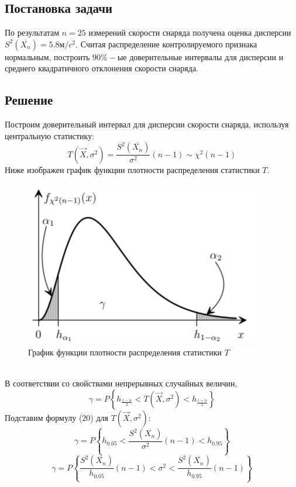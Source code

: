 \subsection*{Постановка задачи}
По результатам $n = 25$ измерений скорости снаряда получена оценка дисперсии $S^2(\overline{X_n}) = 5.8 м/c^2$. Считая распределение контролируемого признака нормальным, построить $90\%-ые$ доверительные интервалы для дисперсии и среднего квадратичного отклонения скорости снаряда.
\subsection*{Решение}
Построим доверительный интервал для дисперсии скорости снаряда, используя центральную статистику:
\begin{equation}
T(\vec{X}, \sigma^2) = \frac{S^2(\overline{X_n})}{\sigma^2}(n-1) \sim \chi^2(n-1)
\end{equation}
Ниже изображен график функции плотности распределения статистики $T$. 
\begin{figure}[h!]
	\caption{График функции плотности распределения статистики $T$}
	\center \includegraphics{img/1.png}
\end{figure}\\
В соответствии со свойствами непрерывных случайных величин,
\begin{equation}
\gamma = P\left\{ h_{\frac{1-\alpha}{2}} < T(\vec{X}, \sigma^2) < h_{\frac{1+\alpha}{2}}\right\}
\end{equation}
Подставим формулу (20) для $T(\vec{X}, \sigma^2)$:
\begin{equation}
\gamma = P\left\{ h_{0.05} < \frac{S^2(\overline{X_n})}{\sigma^2}(n-1) < h_{0.95}\right\}
\end{equation}
\begin{equation}
\gamma = P\left\{ \frac{S^2(\overline{X_n})}{h_{0.05}}(n-1) < \sigma^2 < \frac{S^2(\overline{X_n})}{h_{0.95}}(n-1)\right\}
\end{equation}
